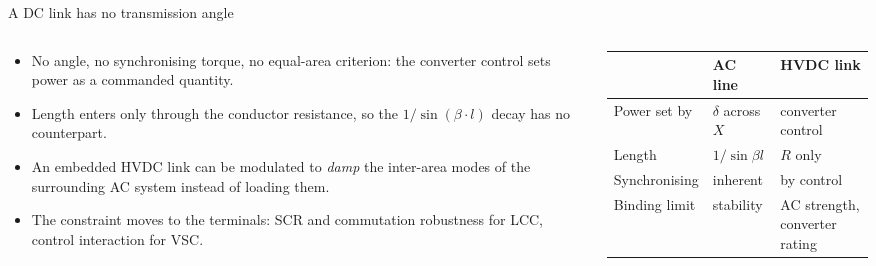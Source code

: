 \begin{frame}{A DC link has no transmission angle}
  \begin{columns}[T,onlytextwidth]
    \begin{column}{0.48\textwidth}
      {\small
      \begin{itemize}
        \setlength{\itemsep}{0.4em}
        \item No angle, no synchronising torque, no equal-area criterion:
              the converter control sets power as a commanded quantity.
        \item Length enters only through the conductor resistance, so the
              $1/\sin\left(\beta\cdot l\right)$ decay has no counterpart.
        \item An embedded HVDC link can be modulated to \emph{damp} the
              inter-area modes of the surrounding AC system instead of
              loading them.
        \item The constraint moves to the terminals: SCR and commutation
              robustness for LCC, control interaction for VSC.
      \end{itemize}}
    \end{column}
    \begin{column}{0.49\textwidth}
      \renewcommand{\arraystretch}{1.25}
      {\footnotesize
      \begin{tabularx}{\linewidth}{@{}l
          >{\raggedright\arraybackslash}X
          >{\raggedright\arraybackslash}X@{}}
        & \textbf{AC line} & \textbf{HVDC link} \\
        \hline
        Power set by  & $\delta$ across $X$ & converter control \\
        Length        & $1/\sin\beta l$     & $R$ only \\
        Synchronising & inherent            & by control \\
        Binding limit & stability           & AC strength, converter
                                              rating \\
        \hline
      \end{tabularx}}
    \end{column}
  \end{columns}
\end{frame}
